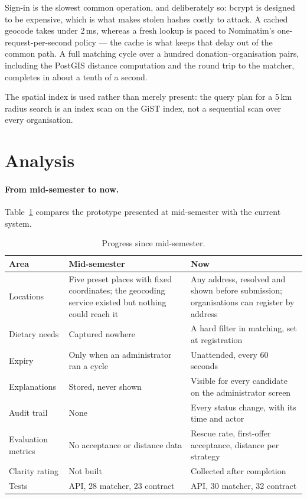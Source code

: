 \documentclass[11pt,a4paper]{report}
\begin{document}
Sign-in is the slowest common operation, and deliberately so: bcrypt is designed
to be expensive, which is what makes stolen hashes costly to attack. A cached
geocode takes under 2\,ms, whereas a fresh lookup is paced to Nominatim's
one-request-per-second policy --- the cache is what keeps that delay out of the
common path. A full matching cycle over a hundred donation--organisation pairs,
including the PostGIS distance computation and the round trip to the matcher,
completes in about a tenth of a second.

The spatial index is used rather than merely present: the query plan for a 5\,km
radius search is an index scan on the GiST index, not a sequential scan over
every organisation.

\section{Analysis}

\paragraph{From mid-semester to now.} Table~\ref{tab:progress} compares the
prototype presented at mid-semester with the current system.

\begin{table}[H]
\centering
\small
\begin{tabularx}{\linewidth}{@{}l>{\raggedright\arraybackslash}X>{\raggedright\arraybackslash}X@{}}
\toprule
\textbf{Area} & \textbf{Mid-semester} & \textbf{Now} \\
\midrule
Locations & Five preset places with fixed coordinates; the geocoding service
  existed but nothing could reach it & Any address, resolved and shown before
  submission; organisations can register by address \\
Dietary needs & Captured nowhere & A hard filter in matching, set at registration \\
Expiry & Only when an administrator ran a cycle & Unattended, every 60 seconds \\
Explanations & Stored, never shown & Visible for every candidate on the
  administrator screen \\
Audit trail & None & Every status change, with its time and actor \\
Evaluation metrics & No acceptance or distance data & Rescue rate, first-offer
  acceptance, distance per strategy \\
Clarity rating & Not built & Collected after completion \\
Tests & 42 API, 28 matcher, 23 contract & 84 API, 30 matcher, 32 contract \\
\bottomrule
\end{tabularx}
\caption{Progress since mid-semester.}
\label{tab:progress}
\end{table}
\end{document}

